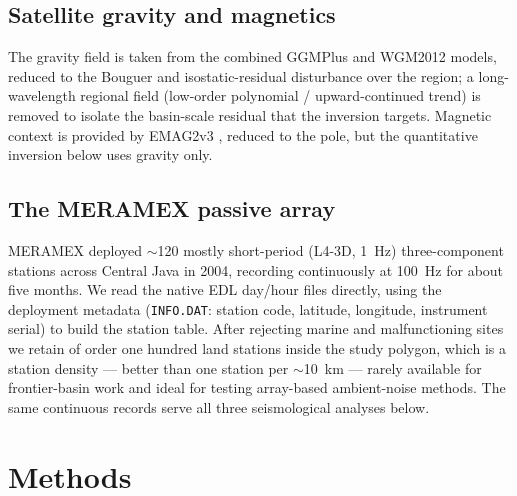 \subsection{Satellite gravity and magnetics}
The gravity field is taken from the combined GGMPlus \citep{Hirt2013} and WGM2012
\citep{Balmino2012} models, reduced to the Bouguer and isostatic-residual
disturbance over the region; a long-wavelength regional field (low-order
polynomial / upward-continued trend) is removed to isolate the basin-scale
residual that the inversion targets. Magnetic context is provided by EMAG2v3
\citep{Meyer2017}, reduced to the pole, but the quantitative inversion below uses
gravity only.

\subsection{The MERAMEX passive array}
MERAMEX \citep{Wagner2007,Koulakov2007} deployed $\sim$120 mostly short-period
(L4-3D, \SI{1}{\hertz}) three-component stations across Central Java in 2004,
recording continuously at \SI{100}{\hertz} for about five months. We read the
native EDL day/hour files directly, using the deployment metadata
(\texttt{INFO.DAT}: station code, latitude, longitude, instrument serial) to
build the station table. After rejecting marine and malfunctioning sites we
retain of order one hundred land stations inside the study polygon, which is a
station density --- better than one station per $\sim$10~km --- rarely available
for frontier-basin work and ideal for testing array-based ambient-noise methods.
The same continuous records serve all three seismological analyses below.

\section{Methods}

